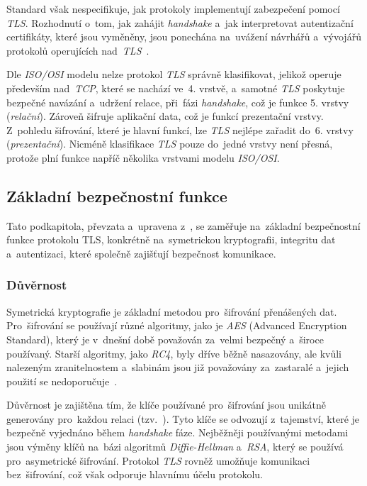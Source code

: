 Standard však nespecifikuje, jak protokoly implementují zabezpečení pomocí \textit{TLS}. Rozhodnutí o~tom, jak zahájit \textit{handshake} a~jak interpretovat autentizační certifikáty, které jsou vyměněny, jsou ponechána na~uvážení návrhářů a~vývojářů protokolů operujících nad~\textit{TLS}~\cite{rfc-tls12}. 

Dle \textit{ISO/OSI} modelu nelze protokol \textit{TLS} správně klasifikovat, jelikož operuje především nad~\textit{TCP}, které se nachází ve~4. vrstvě, a~samotné \textit{TLS} poskytuje bezpečné navázání a~udržení relace, při~fázi \textit{handshake}, což je funkce 5. vrstvy (\textit{relační}). Zároveň šifruje aplikační data, což je funkcí prezentační vrstvy. Z~pohledu šifrování, které je hlavní funkcí, lze \textit{TLS} nejlépe zařadit do~6. vrstvy (\textit{prezentační}). Nicméně klasifikace \textit{TLS} pouze do~jedné vrstvy není přesná, protože plní funkce napříč několika vrstvami modelu \textit{ISO/OSI}.

\subsection{Základní bezpečnostní funkce}

Tato podkapitola, převzata a~upravena z~\cite{rfc-tls12}, se zaměřuje na~základní bezpečnostní funkce protokolu TLS, konkrétně na~symetrickou kryptografii, integritu dat a~autentizaci, které společně zajišťují bezpečnost komunikace.

\subsubsection{Důvěrnost}
Symetrická kryptografie je základní metodou pro~šifrování přenášených dat. Pro~šifrování se používají různé algoritmy, jako je \textit{AES} (Advanced Encryption Standard), který je v~dnešní době považován za~velmi bezpečný a~široce používaný. Starší algoritmy, jako \textit{RC4}, byly dříve běžně nasazovány, ale kvůli nalezeným zranitelnostem a~slabinám jsou již považovány za~zastaralé a~jejich použití se nedoporučuje~\cite{rfc-rc4}.

Důvěrnost je zajištěna tím, že klíče používané pro~šifrování jsou unikátně generovány pro~každou relaci (tzv.~). Tyto klíče se odvozují z~tajemství, které je bezpečně vyjednáno během \textit{handshake} fáze. Nejběžněji používanými metodami jsou výměny klíčů na~bázi algoritmů \textit{Diffie-Hellman} a~\textit{RSA}, který se používá pro~asymetrické šifrování. Protokol \textit{TLS} rovněž umožňuje komunikaci bez~šifrování, což však odporuje hlavnímu účelu protokolu.

